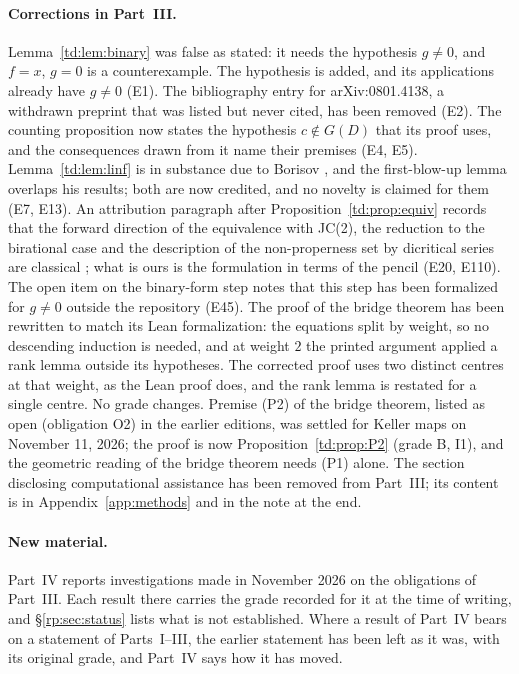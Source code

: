 \documentclass[a4paper,11pt]{article}
\theoremstyle{jsplain}
\theoremstyle{jsdef}
\theoremstyle{jsrem}
\begin{document}
\paragraph{Corrections in Part~III.} Lemma~\ref{td:lem:binary} was false as stated: it needs the hypothesis $g\ne0$, and $f=x$, $g=0$ is a counterexample. The hypothesis is added, and its applications already have $g\ne0$ (E1). The bibliography entry for arXiv:0801.4138, a withdrawn preprint that was listed but never cited, has been removed (E2). The counting proposition now states the hypothesis $c\notin G(D)$ that its proof uses, and the consequences drawn from it name their premises (E4, E5). Lemma~\ref{td:lem:linf} is in substance due to Borisov \cite{Borisov2009,Borisov2011}, and the first-blow-up lemma overlaps his results; both are now credited, and no novelty is claimed for them (E7, E13). An attribution paragraph after Proposition~\ref{td:prop:equiv} records that the forward direction of the equivalence with JC(2), the reduction to the birational case and the description of the non-properness set by dicritical series are classical \cite{Borisov2011,Keller1939,Borisov2009,Chau2007}; what is ours is the formulation in terms of the pencil (E20, E110). The open item on the binary-form step notes that this step has been formalized for $g\ne0$ outside the repository (E45). The proof of the bridge theorem has been rewritten to match its Lean formalization: the equations split by weight, so no descending induction is needed, and at weight $2$ the printed argument applied a rank lemma outside its hypotheses. The corrected proof uses two distinct centres at that weight, as the Lean proof does, and the rank lemma is restated for a single centre. No grade changes. Premise (P2) of the bridge theorem, listed as open (obligation O2) in the earlier editions, was settled for Keller maps on November 11, 2026; the proof is now Proposition~\ref{td:prop:P2} (grade B, I1), and the geometric reading of the bridge theorem needs (P1) alone. The section disclosing computational assistance has been removed from Part~III; its content is in Appendix~\ref{app:methods} and in the note at the end.

\paragraph{New material.} Part~IV reports investigations made in November 2026 on the obligations of Part~III. Each result there carries the grade recorded for it at the time of writing, and \S\ref{rp:sec:status} lists what is not established. Where a result of Part~IV bears on a statement of Parts~I--III, the earlier statement has been left as it was, with its original grade, and Part~IV says how it has moved.
\end{document}

